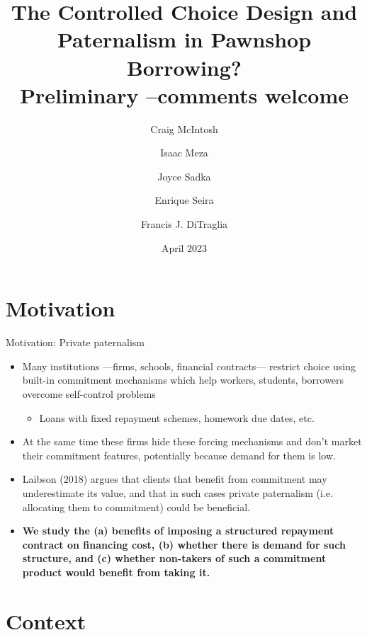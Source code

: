 \documentclass[8pt]{beamer}
\title{The Controlled Choice Design and Paternalism in Pawnshop Borrowing? \\
Preliminary --comments welcome}
\author{Craig McIntosh\inst{1} \and Isaac Meza\inst{2} \and Joyce Sadka\inst{3} \and Enrique Seira\inst{4} \and Francis J. DiTraglia\inst{5} }
\institute[UTran]{\inst{1} UCSD, \inst{2} Harvard , \inst{3} ITAM , \inst{4} MSU , \inst{5} Oxford}
\date{April 2023}
\begin{document}
\begin{frame}[c, noframenumbering]%
\titlepage
\end{frame}


\section{Motivation}



\begin{frame}{Motivation: Private paternalism}
\begin{itemize}
    \vfill \item Many institutions —firms, schools, financial contracts— restrict choice using built-in commitment mechanisms which help workers, students, borrowers overcome self-control problems
    \begin{itemize}
        \item Loans with fixed repayment schemes, homework due dates, etc.
    \end{itemize}
    \vfill \pause\item At the same time these firms hide these forcing mechanisms and don’t market their commitment features, potentially because demand for them is low.
    \vfill  \item  Laibson (2018) argues that clients that benefit from commitment may underestimate its value, and that in such cases private paternalism (i.e. allocating them to commitment) could be beneficial.
    \vfill  \pause\item  \textbf{We study the (a) benefits of imposing a structured repayment contract on financing cost, (b) whether there is demand for such structure, and (c) whether non-takers of such a commitment product would benefit from taking it.}
\end{itemize}

\end{frame}



\section{Context}
\end{document}
